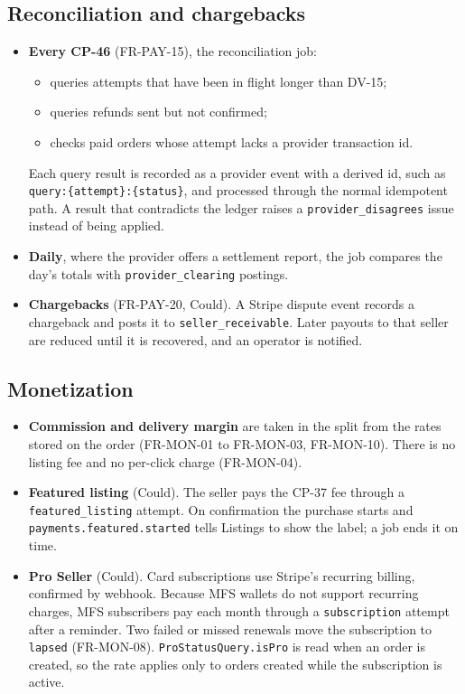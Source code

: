\documentclass[11pt,a4paper]{article}
\begin{document}
\subsection{Reconciliation and chargebacks}
\label{sec:recon}
\begin{itemize}[nosep]
  \item \textbf{Every CP-46} (FR-PAY-15), the reconciliation job:
  \begin{itemize}[nosep]
    \item queries attempts that have been in flight longer than DV-15;
    \item queries refunds sent but not confirmed;
    \item checks paid orders whose attempt lacks a provider transaction id.
  \end{itemize}
  Each query result is recorded as a provider event with a derived id, such as \texttt{query:\allowbreak\{attempt\}:\allowbreak\{status\}}, and processed through the normal idempotent path. A result that contradicts the ledger raises a \texttt{provider\_disagrees} issue instead of being applied.
  \item \textbf{Daily}, where the provider offers a settlement report, the job compares the day's totals with \texttt{provider\_clearing} postings.
  \item \textbf{Chargebacks} (FR-PAY-20, Could). A Stripe dispute event records a chargeback and posts it to \texttt{seller\_receivable}. Later payouts to that seller are reduced until it is recovered, and an operator is notified.
\end{itemize}

\subsection{Monetization}
\label{sec:mon}
\begin{itemize}[nosep]
  \item \textbf{Commission and delivery margin} are taken in the split from the rates stored on the order (FR-MON-01 to FR-MON-03, FR-MON-10). There is no listing fee and no per-click charge (FR-MON-04).
  \item \textbf{Featured listing} (Could). The seller pays the CP-37 fee through a \texttt{featured\_listing} attempt. On confirmation the purchase starts and \texttt{payments.featured.started} tells Listings to show the label; a job ends it on time.
  \item \textbf{Pro Seller} (Could). Card subscriptions use Stripe's recurring billing, confirmed by webhook. Because MFS wallets do not support recurring charges, MFS subscribers pay each month through a \texttt{subscription} attempt after a reminder. Two failed or missed renewals move the subscription to \texttt{lapsed} (FR-MON-08). \texttt{ProStatusQuery.isPro} is read when an order is created, so the rate applies only to orders created while the subscription is active.
\end{itemize}
\end{document}
